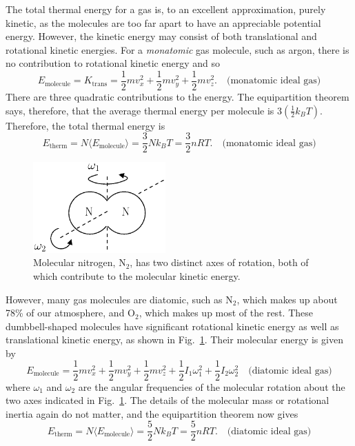 The total thermal energy for a gas is, to an excellent
approximation, purely kinetic, as the molecules are too far apart to
have an appreciable potential energy.  However, the kinetic energy 
may consist of both translational and rotational kinetic energies.
For a {\it monatomic} gas molecule, such as argon, there is no
contribution to rotational kinetic energy and so
\begin{equation}
 E_\text{molecule} = K_\text{trans} = {\textstyle\frac{1}{2}} m v_x^2 + 
{\textstyle\frac{1}{2}} m v_y^2 + {\textstyle\frac{1}{2}} m v_z^2. 
\quad\text{(monatomic ideal gas)}
\label{eq:monatomic_Emolecule}
\end{equation}
There are three quadratic contributions to the energy. 
The equipartition theorem says, therefore, that the average thermal
energy per molecule is $3(\textstyle\frac{1}{2}k_BT)$.  Therefore, the
total thermal energy is
\begin{equation}
E_\text{therm} = N\langle
E_\text{molecule}\rangle =
 {\textstyle\frac{3}{2}} N k_B T = {\textstyle\frac{3}{2}} n R T.
\quad\text{(monatomic ideal gas)}
\label{eq:monatomic_ideal_gas}
\end{equation}

\begin{figure}
\begin{center}
\includegraphics[width=2in]{liquids_and_gases/diatomic.eps}
\caption{Molecular nitrogen, N$_2$, has two distinct axes of rotation, 
both of which contribute to the molecular kinetic energy.}
\label{fig:diatomic}
\end{center}
\end{figure}

However, many gas molecules are diatomic, such as N$_2$, which makes up
about 78\% of our atmosphere, and O$_2$, which makes up most of the rest.
These dumbbell-shaped molecules have significant rotational kinetic energy
as well as translational kinetic energy, as shown in Fig.~\ref{fig:diatomic}.
Their molecular energy is given by
\begin{equation}
E_\text{molecule} = {\textstyle\frac{1}{2}} m v_x^2 +
{\textstyle\frac{1}{2}} m v_y^2 + {\textstyle\frac{1}{2}} m v_z^2
+{\textstyle\frac{1}{2}} I_1 \omega_1^2 + {\textstyle\frac{1}{2}} I_2
\omega_2^2
\quad\text{(diatomic ideal gas)}
\label{eq:diatomic_Emolecule}
\end{equation}
where $\omega_1$ and $\omega_2$ are the angular frequencies of the molecular
rotation about the two axes indicated in Fig.~\ref{fig:diatomic}.  The details
of the molecular mass or rotational inertia again do not matter, and 
the equipartition theorem now gives
\begin{equation}
E_\text{therm} = N\langle E_\text{molecule}\rangle
 = {\textstyle\frac{5}{2}} N k_B T = {\textstyle\frac{5}{2}} n R T.
\quad\text{(diatomic ideal gas)}
\label{eq:diatomic_ideal_gas}
\end{equation}

